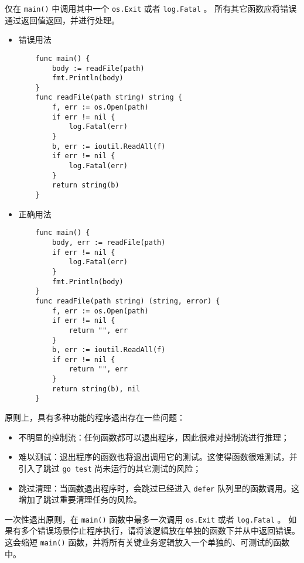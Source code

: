 仅在 \texttt{main()} 中调用其中一个 \texttt{os.Exit} 或者 \texttt{log.Fatal\*} 。
所有其它函数应将错误通过返回值返回，并进行处理。
\begin{itemize}[leftmargin=4em]
\item 错误用法

  \begin{verbatim}
    func main() {
    	body := readFile(path)
    	fmt.Println(body)
    }
    func readFile(path string) string {
    	f, err := os.Open(path)
    	if err != nil {
    		log.Fatal(err)
    	}
    	b, err := ioutil.ReadAll(f)
    	if err != nil {
    		log.Fatal(err)
    	}
    	return string(b)
    }
  \end{verbatim}
\item 正确用法

  \begin{verbatim}
    func main() {
    	body, err := readFile(path)
    	if err != nil {
    		log.Fatal(err)
    	}
    	fmt.Println(body)
    }
    func readFile(path string) (string, error) {
    	f, err := os.Open(path)
    	if err != nil {
    		return "", err
    	}
    	b, err := ioutil.ReadAll(f)
    	if err != nil {
    		return "", err
    	}
    	return string(b), nil
    }
  \end{verbatim}
\end{itemize}

原则上，具有多种功能的程序退出存在一些问题：
\begin{itemize}[leftmargin=4em]
\item 不明显的控制流：任何函数都可以退出程序，因此很难对控制流进行推理；
\item 难以测试：退出程序的函数也将退出调用它的测试。这使得函数很难测试，并引入了跳过 \texttt{go test} 尚未运行的其它测试的风险；
\item 跳过清理：当函数退出程序时，会跳过已经进入 \texttt{defer} 队列里的函数调用。这增加了跳过重要清理任务的风险。
\end{itemize}

一次性退出原则，在 \texttt{main()} 函数中最多一次调用 \texttt{os.Exit} 或者 \texttt{log.Fatal} 。
如果有多个错误场景停止程序执行，请将该逻辑放在单独的函数下并从中返回错误。
这会缩短 \texttt{main()} 函数，并将所有关键业务逻辑放入一个单独的、可测试的函数中。

